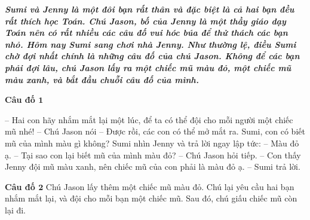 \centering
\endgroup
\vspace*{35pt}

	\textbf{\color{toancuabi}\textit{Sumi và Jenny là một đôi bạn rất  thân và đặc biệt là cả hai bạn đều rất thích học  Toán. Chú Jason, bố của Jenny là một thầy giáo dạy Toán nên có rất nhiều các câu đố vui hóc búa để thử thách các  bạn nhỏ. 
	\vskip 0.2cm
	Hôm nay Sumi sang chơi nhà Jenny. Như thường lệ, điều Sumi chờ đợi nhất chính là những câu đố của chú Jason.
	\vskip 0.2cm
	Không để các bạn phải đợi lâu, chú Jason lấy ra một chiếc mũ màu đỏ, một chiếc mũ màu xanh, và bắt đầu chuỗi câu đố của mình.}}
	
	\vskip 0.1cm
	\vspace*{1pt}
	\textbf{\color{toancuabi}Câu đố $\pmb1$}	


\vspace*{-20pt}\begin{adjustwidth}{130pt}{0pt}
	-- Hai con hãy nhắm mắt lại một lúc, để ta có thể đội cho mỗi người một chiếc mũ nhé! -- Chú Jason nói
	-- Được rồi, các con có thể mở mắt ra. Sumi, con có biết mũ của mình màu gì không?
	\vskip 0.1cm
	Sumi nhìn Jenny và trả lời ngay lập tức:
	\vskip 0.1cm
	-- Màu đỏ ạ.
	\vskip 0.1cm
	-- Tại sao con lại biết mũ của mình màu đỏ? -- Chú Jason hỏi tiếp.
	\vskip 0.1cm
	-- Con thấy Jenny đội mũ màu xanh, nên chiếc mũ của con phải là màu đỏ ạ. -- Sumi trả lời.
\end{adjustwidth}
	\textbf{\color{toancuabi}Câu đố $\pmb2$}
	\vskip 0.1cm
	Chú Jason lấy thêm một chiếc mũ màu đỏ. Chú lại yêu cầu hai bạn nhắm mắt lại, và đội cho mỗi bạn một chiếc mũ. Sau đó, chú giấu chiếc mũ còn lại đi.
